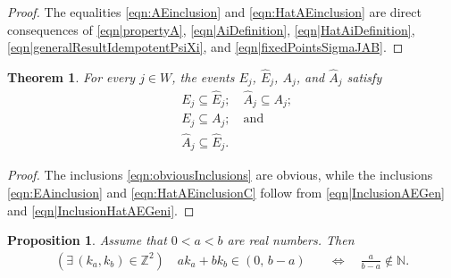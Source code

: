 \documentclass[reqno]{amsart}
\newtheorem{proposition}{Proposition}
\newtheorem{theorem}{Theorem}
\begin{document}
\begin{proof} The equalities \eqref{eqn:AEinclusion} and \eqref{eqn:HatAEinclusion} are direct consequences of \eqref{eqn|propertyA}, \eqref{eqn|AiDefinition}, \eqref{eqn|HatAiDefinition}, \eqref{eqn|generalResultIdempotentPsiXi},  and \eqref{eqn|fixedPointsSigmaJAB}.
\end{proof} 


\begin{theorem} For every $j\in W$, the events $E_j$, $\hat E_j$, $A_j$, and $\hat A_j$ satisfy
\begin{align}
&E_j\subseteq \hat E_j;\quad \hat A_j\subseteq A_j;
\label{eqn:obviousInclusions}\\
&E_j\subseteq A_j ;\quad \text{and}
\label{eqn:EAinclusion}\\
& \hat A_j\subseteq \hat E_j.\label{eqn:HatAEinclusionC}
\end{align}
\end{theorem} 
\begin{proof}
The inclusions \eqref{eqn:obviousInclusions} are obvious, while the inclusions \eqref{eqn:EAinclusion} and \eqref{eqn:HatAEinclusionC} follow from \eqref{eqn|InclusionAEGen} 
and \eqref{eqn|InclusionHatAEGeni}.
\end{proof}


\begin{proposition}\label{thm|IntDependent}
Assume that $0<a<b$ are real numbers. Then
\begin{align}
\left(\exists\,(k_a,k_b)\in\mathbb{Z}^2\right) \quad 
ak_a + bk_b \in (0,\,b-a) 
\quad &\Longleftrightarrow \quad 
\frac{a}{b-a} \notin \mathbb{N}.
\label{eqn|IntDependent}
\end{align} 
\end{proposition}
\end{document}
